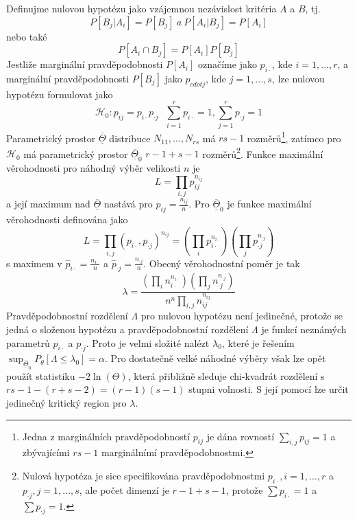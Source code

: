 Definujme nulovou hypotézu jako vzájemnou nezávislost kritéria $A$ a $B$, tj.
\begin{equation*}
P[B_j | A_i] = P[B_j] ~ \textit{a} ~ P[A_i | B_j] = P[A_i]
\end{equation*}
nebo také
\begin{equation*}
P[A_i \cap B_j] = P[A_i]P[B_j]
\end{equation*}
Jestliže marginální pravděpodobnosti $P[A_i]$ označíme jako $p_{i \cdot}$, kde $i = 1, ..., r$, a marginální pravděpodobnosti $P[B_j]$ jako $p_{cdot j}$, kde $j = 1, ..., s$, lze nulovou hypotézu formulovat jako
\begin{equation*}
\mathscr{H}_0: p_{ij} = p_{i \cdot} p_{\cdot j} ~~~ \sum_{i = 1}^r p_{i \cdot} = 1, \sum_{j = 1}^r p_{\cdot j} = 1
\end{equation*}
Parametrický prostor $\overline{\underline{\Theta}}$ distribuce $N_{11}, ..., N_{rs}$ má $rs - 1$ rozměrů\footnote{Jedna z marginálních pravděpodobností $p_{ij}$ je dána rovností $\sum_{i,j} p_{ij} = 1$ a zbývajícími $rs - 1$ marginálnímí pravděpodobnostmi.}, zatímco pro $\mathscr{H}_0$ má parametrický prostor $\overline{\underline{\Theta}}_0$ $r - 1 + s - 1$ rozměrů\footnote{Nulová hypotéza je sice specifikována pravděpodobnostmi $p_{i \cdot}, i = 1, ..., r$ a $p_{\cdot j}, j = 1, ..., s$, ale počet dimenzí je $r - 1  + s - 1$, protože $\sum p_{i \cdot} = 1$ a $\sum p_{\cdot j} = 1$.}. Funkce maximální věrohodnosti pro náhodný výběr velikosti $n$ je
\begin{equation*}
L = \prod_{i,j} p_{ij}^{n_{ij}}
\end{equation*}
a její maximum nad $\overline{\underline{\Theta}}$ nastává pro $\hat{p}_{ij} = \frac{n_{ij}}{n}$. Pro $\overline{\underline{\Theta}}_0$ je funkce maximální věrohodnosti definována jako
\begin{equation*}
L = \prod_{i,j}(p_{i \cdot}, p_{\cdot j})^{n_{ij}} = \left(\prod_i p_{i \cdot}^{n_{i \cdot}}\right)\left(\prod_j p_{\cdot j}^{n_{\cdot j}}\right)
\end{equation*}
s maximem v $\hat{p}_{i \cdot} = \frac{n_{i \cdot}}{n}$ a $\hat{p}_{\cdot j} = \frac{n_{\cdot j}}{n}$. Obecný věrohodnostní poměr je tak
\begin{equation*}
\lambda = \frac{\left(\prod_i n_{i \cdot}^{n_{i \cdot}}\right)\left(\prod_j n_{\cdot j}^{n_{\cdot j}}\right)}{n^n \prod_{i, j}n_{ij}^{n_{ij}}}
\end{equation*}
Pravděpodobnostní rozdělení $\Lambda$ pro nulovou hypotézu není jedinečné, protože se jedná o složenou hypotézu a pravděpodobnostní rozdělení $\Lambda$ je funkcí neznámých parametrů $p_{i \cdot}$ a $p_{\cdot j}$. Proto je velmi složité nalézt $\lambda_0$, které je řešením $\sup_{\overline{\underline{\Theta}}_0}P_{\theta}[\Lambda \le \lambda_0] = \alpha$. Pro dostatečně velké náhodné výběry však lze opět použít statistiku $-2 \ln(\Theta)$, která přibližně sleduje chi-kvadrát rozdělení s $rs - 1 - (r + s - 2) = (r - 1)(s -1)$ stupni volnosti. S její pomocí lze určit jedinečný kritický region pro $\lambda$.


